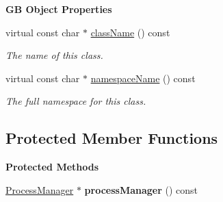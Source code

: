 \begin{Indent}\textbf{ GB Object Properties}\par
\begin{DoxyCompactItemize}
\item 
virtual const char $\ast$ \mbox{\hyperlink{classrev_1_1_threaded_process_a7b198a27cb18d6da765cef1ed66a169c}{class\+Name}} () const
\begin{DoxyCompactList}\small\item\em The name of this class. \end{DoxyCompactList}\item 
virtual const char $\ast$ \mbox{\hyperlink{classrev_1_1_threaded_process_a102e7ef754f41bb16225c4207b6b3c58}{namespace\+Name}} () const
\begin{DoxyCompactList}\small\item\em The full namespace for this class. \end{DoxyCompactList}\end{DoxyCompactItemize}
\end{Indent}
\subsection*{Protected Member Functions}
\begin{Indent}\textbf{ Protected Methods}\par
\begin{DoxyCompactItemize}
\item 
\mbox{\label{classrev_1_1_threaded_process_a79ec50cd7a0a3a49862a680705de979a}} 
\mbox{\hyperlink{classrev_1_1_process_manager}{Process\+Manager}} $\ast$ {\bfseries process\+Manager} () const
\end{DoxyCompactItemize}
\end{Indent}
